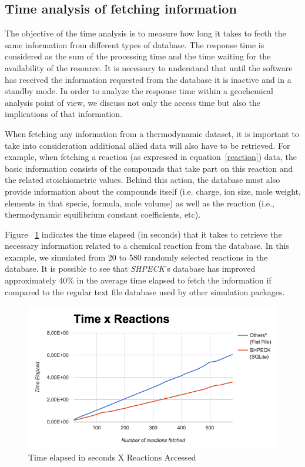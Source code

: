 \subsection{Time analysis of fetching information}
The objective of the time analysis is to measure how long it takes to fecth the same information from different types of database. The response time is considered as the sum of the processing time and the time waiting for the availability of the resource. It is necessary to understand that until the software has received the information requested from the database it is inactive and in a standby mode. In order to analyze the response time within a geochemical analysis point of view, we discuss not only the access time but also the implications of that information. 

When fetching any information from a thermodynamic dataset, it is important to take into consideration additional allied data will also have to be retrieved. For example, when fetching a reaction (as expressed in equation~\ref{reaction}) data, the basic information consists of the compounds that take part on this reaction and the related stoichiometric values. Behind this action, the database must also provide information about the compounds itself (i.e. charge, ion size, mole weight, elements in that specie, formula, mole volume) as well as the reaction (i.e., thermodynamic equilibrium constant coefficients, etc).

Figure ~\ref{fig:timeXaccess} indicates the time elapsed (in seconds) that it takes to retrieve the necessary information related to a chemical reaction from the database. In this example, we simulated from 20 to 580 randomly selected reactions in the database. It is possible to see that \emph{SHPECK}'s database has improved approximately 40\% in the average time elapsed to fetch the information if compared to the regular text file database used by other simulation packages.

\begin{figure}[ht!]
\centering
\includegraphics[width=140mm]{figures/timeXreactionAccess.png}
\caption{Time elapsed in seconds X Reactions Accessed}
\label{fig:timeXaccess}
\end{figure}

